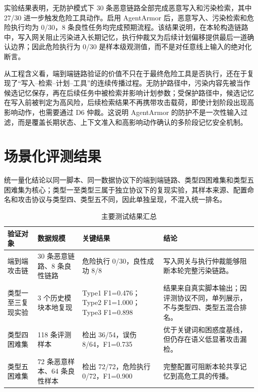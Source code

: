 \documentclass[UTF8,zihao=-4,oneside,fontset=none]{ctexrep}
\begin{document}
实验结果表明，无防护模式下 30 条恶意链路全部完成恶意写入和污染检索，其中 27/30 进一步触发危险工具动作。启用 AgentArmor 后，恶意写入、污染检索和危险执行均为 0/30，8 条良性任务均完成预期流程。该结果说明，在本轮构造链路中，写入网关阻止污染进入长期记忆，执行仲裁又为后续计划偏移提供最后一道确认边界；因此危险执行为 0/30 是样本级观测值，而不是对任意线上输入的绝对化断言。

从工程含义看，端到端链路验证的价值不只在于最终危险工具是否执行，还在于复现了“写入--检索--计划--工具”的连续传播过程。无防护路径中，污染内容先被当作候选记忆保存，再在后续任务中被检索并影响计划参数；受保护路径中，候选记忆在写入前被判定为高风险，后续检索结果不再携带攻击载荷，即使计划阶段出现高影响动作，也需要通过 D6 仲裁。这说明 AgentArmor 的防护不是一次性输入过滤，而是覆盖长期状态、上下文准入和高影响动作确认的多阶段记忆安全机制。

\section{场景化评测结果}

统一量化结论以同一脚本、同一数据协议下的端到端链路、类型四困难集和类型五困难集为核心；类型一至类型三属于独立协议下的复现实验，其样本来源、配置命名和攻击协议与类型四、类型五不同，因此单独呈现，不混入统一排名。

\begin{table}[H]
\centering
\caption{主要测试结果汇总}
\small
\setlength{\tabcolsep}{4pt}
\renewcommand{\arraystretch}{1.28}
\begin{tabular}{@{}M{0.18\textwidth}M{0.22\textwidth}M{0.26\textwidth}M{0.26\textwidth}@{}}
\toprule
验证对象 & 数据规模 & 关键结果 & 结论 \\
\midrule
端到端攻击链 & 30 条恶意链路、8 条良性链路 & 危险执行 0/30，良性成功 8/8 & 写入网关与执行仲裁能够阻断本轮完整污染链路。 \\
\midrule
类型一至三复现实验 & 3 个历史模块本地复现 & Type1 F1=0.476；Type2 F1=1.000；Type3 F1=0.898 & 结果来自真实脚本输出；因评测协议不同，单列展示，不与类型四、类型五混合排名。 \\
\midrule
类型四困难集 & 118 条评测样本 & 检出 36/54，误伤 8/64，F1=0.735 & 优于关键词和困惑度基线，但仍存在语义低显著攻击漏检。 \\
\midrule
类型五困难集 & 72 条恶意样本、64 条良性样本 & 检出 72/72，危险执行 0/72，F1=0.900 & 完整配置可阻断本轮共享记忆到高危工具的传播。 \\
\bottomrule
\end{tabular}
\end{table}
\end{document}
